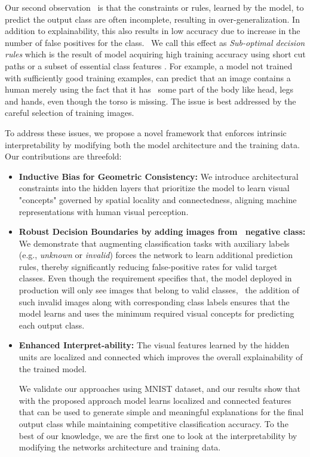 \documentclass[pdflatex,referee,lineno]{sn-jnl}
\theoremstyle{thmstyleone}
\theoremstyle{thmstyletwo}
\theoremstyle{thmstylethree}
\begin{document}
Our second observation  is that the constraints or rules, learned by the model, to predict the output class are often incomplete, resulting in over-generalization. In addition to explainability, this also results in low accuracy  due to increase in the number of false positives for the  class.  We call this effect as \textit{Sub-optimal decision rules} which is the result of  model acquiring high training accuracy using short cut paths  or  a subset of  essential class features .  For example, a model not trained with sufficiently good training examples, can predict that an image contains a human merely using the fact that it has  some part of the body like head, legs and hands, even though the torso is missing. The issue is best addressed by the careful selection of training images. 

To address these issues, we propose a novel framework that enforces intrinsic interpretability by modifying both the model architecture and the training data. Our contributions are threefold:

\begin{itemize}
    \item \textbf{Inductive Bias for Geometric Consistency:} We introduce architectural constraints into the hidden layers that prioritize the model to learn visual "concepts" governed by spatial locality and connectedness, aligning machine representations with human visual perception.
    \item \textbf{Robust Decision Boundaries by adding images from  negative class:} We demonstrate that augmenting classification tasks with auxiliary labels (e.g., \textit{unknown} or \textit{invalid}) forces the network to learn additional prediction rules, thereby significantly reducing false-positive rates for valid target classes. Even though the requirement specifies that, the model deployed in production will only see images that belong to valid classes,  the addition of such invalid images along with corresponding class labels ensures that the model learns and uses the minimum required visual concepts for predicting each output class.
    \item \textbf{Enhanced Interpret-ability:} The visual features learned by the hidden units are localized and connected which improves the overall explainability of the trained model.

We validate our approaches using MNIST dataset,  and our results show that with the  proposed  approach model learns  localized and connected  features that can be used to generate simple and meaningful explanations for the final output class while maintaining competitive classification accuracy. To the best of our knowledge, we are the first one to look at the interpretability by modifying  the networks architecture and training data.
\end{itemize}
\end{document}
